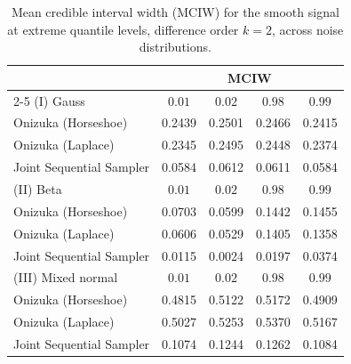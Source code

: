\begin{table}[htbp]
\centering
\caption{Mean credible interval width (MCIW) for the smooth signal at extreme quantile levels, difference order $k = 2$, across noise distributions.}
\label{tab:s_ext_mciw}
\begin{tabular}{lcccc}
\toprule
& \multicolumn{4}{c}{MCIW} \\
\cmidrule(lr){2-5}
(I) Gauss & $0.01$ & $0.02$ & $0.98$ & $0.99$ \\
\midrule
Onizuka (Horseshoe)      & 0.2439 & 0.2501 & 0.2466 & 0.2415 \\
Onizuka (Laplace)        & 0.2345 & 0.2495 & 0.2448 & 0.2374 \\
Joint Sequential Sampler & 0.0584 & 0.0612 & 0.0611 & 0.0584 \\
\midrule
(II) Beta & $0.01$ & $0.02$ & $0.98$ & $0.99$ \\
\midrule
Onizuka (Horseshoe)      & 0.0703 & 0.0599 & 0.1442 & 0.1455 \\
Onizuka (Laplace)        & 0.0606 & 0.0529 & 0.1405 & 0.1358 \\
Joint Sequential Sampler & 0.0115 & 0.0024 & 0.0197 & 0.0374 \\
\midrule
(III) Mixed normal & $0.01$ & $0.02$ & $0.98$ & $0.99$ \\
\midrule
Onizuka (Horseshoe)      & 0.4815 & 0.5122 & 0.5172 & 0.4909 \\
Onizuka (Laplace)        & 0.5027 & 0.5253 & 0.5370 & 0.5167 \\
Joint Sequential Sampler & 0.1074 & 0.1244 & 0.1262 & 0.1084 \\
\bottomrule
\end{tabular}
\end{table}
